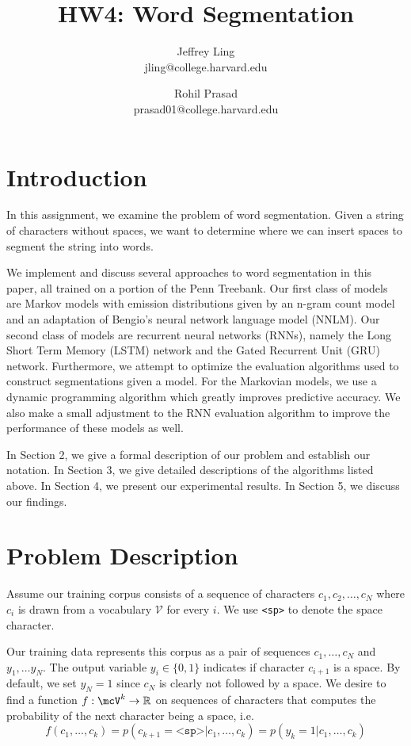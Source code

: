 \documentclass[11pt]{article}
\title{HW4: Word Segmentation}
\author{Jeffrey Ling \\ jling@college.harvard.edu \and Rohil Prasad \\ prasad01@college.harvard.edu }
\begin{document}
\maketitle{}
\section{Introduction}

In this assignment, we examine the problem of word segmentation. Given a string of characters without spaces, we want to determine where we can insert spaces to segment the string into words. 

We implement and discuss several approaches to word segmentation in this paper, all trained on a portion of the Penn Treebank. Our first class of models are Markov models with emission distributions given by an n-gram count model and an adaptation of Bengio's neural network language model (NNLM). Our second class of models are recurrent neural networks (RNNs), namely the Long Short Term Memory (LSTM) network and the Gated Recurrent Unit (GRU) network. Furthermore, we attempt to optimize the evaluation algorithms used to construct segmentations given a model. For the Markovian models, we use a dynamic programming algorithm which greatly improves predictive accuracy. We also make a small adjustment to the RNN evaluation algorithm to improve the performance of these models as well. 

In Section 2, we give a formal description of our problem and establish our notation. In Section 3, we give detailed descriptions of the algorithms listed above. In Section 4, we present our experimental results. In Section 5, we discuss our findings.

\section{Problem Description}

Assume our training corpus consists of a sequence of characters $c_1, c_2, \dots, c_N$ where $c_i$ is drawn from a vocabulary $\mathcal{V}$ for every $i$. We use \texttt{<sp>} to denote the space character. 

Our training data represents this corpus as a pair of sequences $c_1, \ldots, c_N$ and $y_1, \ldots y_N$. The output variable $y_i \in \{0, 1\}$ indicates if character $c_{i+1}$ is a space. By default, we set $y_N = 1$ since $c_N$ is clearly not followed by a space. We desire to find a function $f : \mcV^k \to \mathbb{R}$ on sequences of characters that computes the probability of the next character being a space, i.e.
$$f(c_1, \ldots, c_k) = p(c_{k+1} = \texttt{<sp>} | c_1, \ldots, c_k) = p(y_k = 1 | c_1, \ldots, c_k)$$
\end{document}
